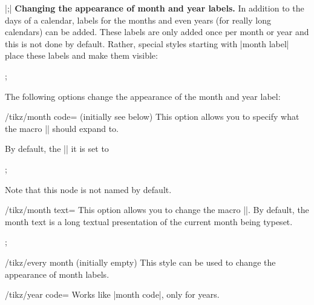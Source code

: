 \begin{command}{\calendar {}|;|}
    \medskip
    \textbf{Changing the appearance of month and year labels.}
    In addition to the days of a calendar, labels for the months and even years
    (for really long calendars) can be added. These labels are only added once
    per month or year and this is not done by default. Rather, special styles
    starting with |month label| place these labels and make them visible:
\begin{codeexample}[preamble={\usetikzlibrary{calendar}}]
\tikz \calendar[dates=2000-01-01 to 2000-02-last,week list,
                month label above centered];
\end{codeexample}

    The following options change the appearance of the month and year label:
    \begin{key}{/tikz/month code= (initially \normalfont see below)}
        This option allows you to specify what the macro |\tikzmonthcode|
        should expand to.

        By default, the |\tikzmonthcode| it is set to
\begin{codeexample}
;
\end{codeexample}
        Note that this node is not named by default.
    \end{key}

    \begin{key}{/tikz/month text=}
        This option allows you to change the macro |\tikzmonthtext|. By
        default, the month text is a long textual presentation of the current
        month being typeset.
\begin{codeexample}[leave comments,preamble={\usetikzlibrary{calendar}}]
\tikz \calendar[dates=2000-01-01 to 2000-01-31,week list,
                month label above centered,
                month text=\textcolor{red}{\%mt} \%y-];
\end{codeexample}
    \end{key}

    \begin{stylekey}{/tikz/every month (initially \normalfont empty)}
        This style can be used to change the appearance of month labels.
    \end{stylekey}

    \begin{key}{/tikz/year code=}
        Works like |month code|, only for years.
    \end{key}


\end{command}
